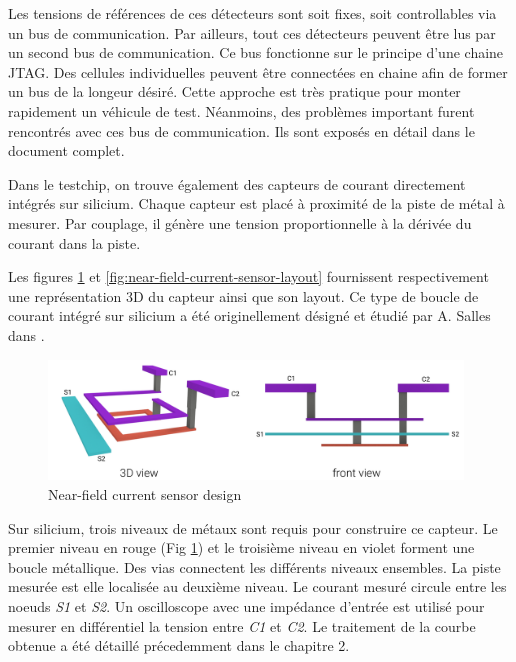 Les tensions de références de ces détecteurs sont soit fixes, soit controllables via un bus de communication.
Par ailleurs, tout ces détecteurs peuvent être lus par un second bus de communication.
Ce bus fonctionne sur le principe d'une chaine JTAG.
Des cellules individuelles peuvent être connectées en chaine afin de former un bus de la longeur désiré.
Cette approche est très pratique pour monter rapidement un véhicule de test.
Néanmoins, des problèmes important furent rencontrés avec ces bus de communication.
Ils sont exposés en détail dans le document complet.

Dans le testchip, on trouve également des capteurs de courant directement intégrés sur silicium.
Chaque capteur est placé à proximité de la piste de métal à mesurer.
Par couplage, il génère une tension proportionnelle à la dérivée du courant dans la piste.

Les figures \ref{fig:near-field-current-sensor} et \ref{fig:near-field-current-sensor-layout} fournissent respectivement une représentation 3D du capteur ainsi que son layout.
Ce type de boucle de courant intégré sur silicium a été originellement désigné et étudié par A. Salles dans \cite{AlainSallesInductors}.

\begin{figure}[!h]
  \centering
  \includegraphics[width=0.98\textwidth]{src/1/figures/near-field-current-sensor.pdf}
  \caption{Near-field current sensor design}
  \label{fig:near-field-current-sensor}
\end{figure}

Sur silicium, trois niveaux de métaux sont requis pour construire ce capteur.
Le premier niveau en rouge (Fig \ref{fig:near-field-current-sensor}) et le troisième niveau en violet forment une boucle métallique.
Des vias connectent les différents niveaux ensembles.
La piste mesurée est elle localisée au deuxième niveau.
Le courant mesuré circule entre les noeuds \textit{S1} et \textit{S2}.
Un oscilloscope avec une impédance d'entrée \textOmega{} est utilisé pour mesurer en différentiel la tension entre \textit{C1} et \textit{C2}.
Le traitement de la courbe obtenue a été détaillé précedemment dans le chapitre 2.

